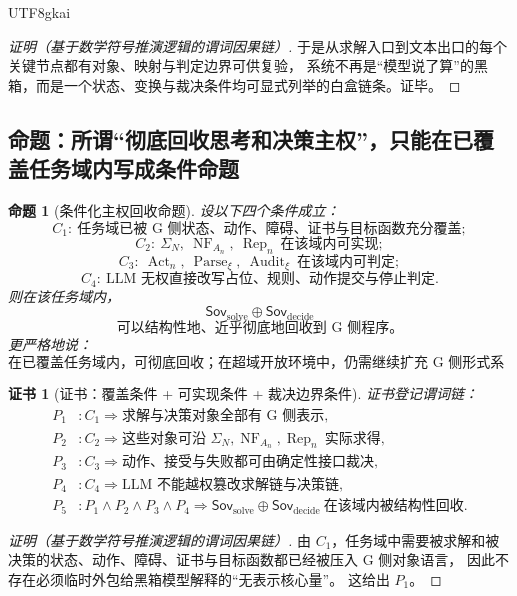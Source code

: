 \documentclass[12pt]{article}
\newtheorem{proposition}{命题}[section]
\newtheorem{Certificate}{证书}[section]
\newcommand{\Parse}{\operatorname{Parse}}
\newcommand{\Audit}{\operatorname{Audit}}
\begin{document}
\begin{CJK*}{UTF8}{gkai}
\begin{proof}[证明（基于数学符号推演逻辑的谓词因果链）]
于是从求解入口到文本出口的每个关键节点都有对象、映射与判定边界可供复验，
系统不再是“模型说了算”的黑箱，而是一个状态、变换与裁决条件均可显式列举的白盒链条。证毕。
\end{proof}

\subsection{命题：所谓“彻底回收思考和决策主权”，只能在已覆盖任务域内写成条件命题}
\label{subsec:tex37-ch6-proposition}

\begin{proposition}[条件化主权回收命题]
\label{prop:tex37-ch6-conditional-sovereignty}
设以下四个条件成立：
\[
  C_1:\ \text{任务域已被 G 侧状态、动作、障碍、证书与目标函数充分覆盖};
\]
\[
  C_2:\ \Sigma_N,\ \operatorname{NF}_{A_n},\ \operatorname{Rep}_n\ \text{在该域内可实现};
\]
\[
  C_3:\ \operatorname{Act}_n,\ \Parse_\xi,\ \Audit_\xi\ \text{在该域内可判定};
\]
\[
  C_4:\ \text{LLM 无权直接改写占位、规则、动作提交与停止判定}.
\]
则在该任务域内，
\[
  \boxed{
    \mathsf{Sov}_{\mathrm{solve}}
    \oplus
    \mathsf{Sov}_{\mathrm{decide}}
  }
\]
\[
  \boxed{
    \text{可以结构性地、近乎彻底地回收到 G 侧程序。}
  }
\]
更严格地说：
\[
  \boxed{
    \text{在已覆盖任务域内，可彻底回收；在超域开放环境中，仍需继续扩充 G 侧形式系统。}
  }
\]
\end{proposition}

\begin{Certificate}[证书：覆盖条件 + 可实现条件 + 裁决边界条件]
\label{cert:tex37-ch6-conditional-sovereignty}
证书登记谓词链：
\[
\begin{aligned}
  P_1 &: C_1\Rightarrow \text{求解与决策对象全部有 G 侧表示},\\
  P_2 &: C_2\Rightarrow \text{这些对象可沿 }\Sigma_N,\operatorname{NF}_{A_n},\operatorname{Rep}_n\ \text{实际求得},\\
  P_3 &: C_3\Rightarrow \text{动作、接受与失败都可由确定性接口裁决},\\
  P_4 &: C_4\Rightarrow \text{LLM 不能越权篡改求解链与决策链},\\
  P_5 &: P_1\wedge P_2\wedge P_3\wedge P_4\Rightarrow \mathsf{Sov}_{\mathrm{solve}}\oplus\mathsf{Sov}_{\mathrm{decide}}\
    \text{在该域内被结构性回收}.
\end{aligned}
\]
\end{Certificate}

\begin{proof}[证明（基于数学符号推演逻辑的谓词因果链）]
由 $C_1$，任务域中需要被求解和被决策的状态、动作、障碍、证书与目标函数都已经被压入 G 侧对象语言，
因此不存在必须临时外包给黑箱模型解释的“无表示核心量”。
这给出 $P_1$。


\end{proof}
\end{CJK*}
\end{document}
